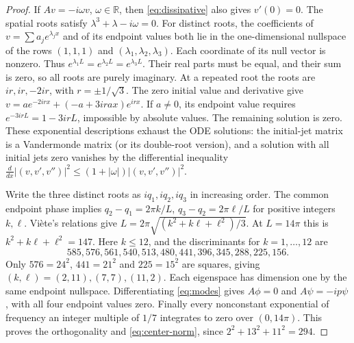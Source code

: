 \documentclass[11pt]{article}
\theoremstyle{remark}\newtheorem{remark}[theorem]{Remark}
\numberwithin{equation}{section}
\begin{document}
\begin{proof}
If $Av=-i\omega v$, $\omega\in\mathbb R$, then
\eqref{eq:dissipative} also gives $v'(0)=0$.
The spatial roots satisfy $\lambda^3+\lambda-i\omega=0$.
For distinct roots, the coefficients of $v=\sum a_j e^{\lambda_jx}$ and
of its endpoint values both lie in the one-dimensional nullspace of the
rows $(1,1,1)$ and $(\lambda_1,\lambda_2,\lambda_3)$.
Each coordinate of its null vector is nonzero. Thus
$e^{\lambda_1L}=e^{\lambda_2L}=e^{\lambda_3L}$.
Their real parts must be equal, and their sum is zero, so all roots are purely
imaginary. At a repeated root the roots are $ir,ir,-2ir$, with
$r=\pm1/\sqrt3$. The zero initial value and derivative give
$v=a e^{-2irx}+(-a+3ira x)e^{irx}$.
If $a\ne0$, its endpoint value requires
$e^{-3irL}=1-3irL$, impossible by absolute values. The remaining solution is zero.
These exponential descriptions exhaust the ODE solutions: the initial-jet
matrix is a Vandermonde matrix (or its double-root version), and a solution
with all initial jets zero vanishes by the differential inequality
$\frac d{dx}|(v,v',v'')|^2\le(1+|\omega|)|(v,v',v'')|^2$.

Write the three distinct roots as $iq_1,iq_2,iq_3$ in increasing order.
The common endpoint phase implies
$q_2-q_1=2\pi k/L$, $q_3-q_2=2\pi\ell/L$ for positive integers $k,\ell$.
Vi\`ete's relations give
$L=2\pi\sqrt{(k^2+k\ell+\ell^2)/3}$.
At $L=14\pi$ this is $k^2+k\ell+\ell^2=147$.
Here $k\le12$, and the discriminants for $k=1,\ldots,12$ are
\[
585,576,561,540,513,480,441,396,345,288,225,156.
\]
Only $576=24^2$, $441=21^2$ and $225=15^2$ are squares, giving
$(k,\ell)=(2,11),(7,7),(11,2)$. Each eigenspace has dimension one by the
same endpoint nullspace. Differentiating \eqref{eq:modes} gives
$A\phi=0$ and $A\psi=-ip\psi$, with all four endpoint values zero.
Finally every nonconstant exponential of frequency an integer multiple of
$1/7$ integrates to zero over $(0,14\pi)$. This proves the orthogonality and
\eqref{eq:center-norm}, since $2^2+13^2+11^2=294$.
\end{proof}
\end{document}
